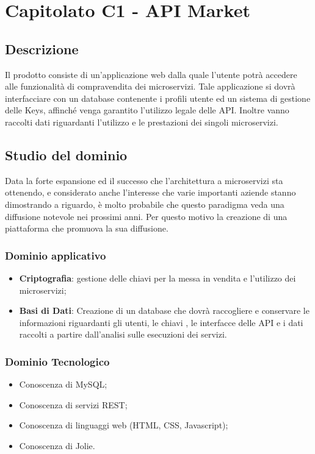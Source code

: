 \documentclass[12pt,a4paper,titlepage]{article}
\begin{document}
	\newpage
	
	\section{Capitolato C1 - API Market}
	\subsection{Descrizione}
	Il prodotto consiste di un'applicazione web dalla quale l'utente potrà accedere alle funzionalità di compravendita dei microservizi. Tale applicazione si dovrà interfacciare con un database contenente i profili utente ed un sistema di gestione delle Keys, affinché venga garantito l'utilizzo legale delle API. Inoltre vanno raccolti dati riguardanti l'utilizzo e le prestazioni dei singoli microservizi.
	
	\subsection{Studio del dominio}
	Data la forte espansione ed il successo che l'architettura a microservizi sta ottenendo, e considerato anche l'interesse che varie importanti aziende stanno dimostrando a riguardo, è molto probabile che questo paradigma veda una diffusione notevole nei prossimi anni. Per questo motivo la creazione di una piattaforma che promuova la sua diffusione.
	\subsubsection{Dominio applicativo} %
	\begin{itemize}
		\item \textbf{Criptografia}: gestione delle chiavi per la messa in vendita e l'utilizzo dei microservizi;
		\item \textbf{Basi di Dati}: Creazione di un database che dovrà raccogliere e conservare le informazioni riguardanti gli utenti, le chiavi , le interfacce delle API e i dati raccolti a partire dall'analisi sulle esecuzioni dei servizi.
	\end{itemize}
	\subsubsection{Dominio Tecnologico}
	\begin{itemize}
		\item Conoscenza di MySQL;
		\item Conoscenza di servizi REST;
		\item Conoscenza di linguaggi web (HTML, CSS, Javascript);
		\item Conoscenza di Jolie.
	\end{itemize}
	
\end{document}
